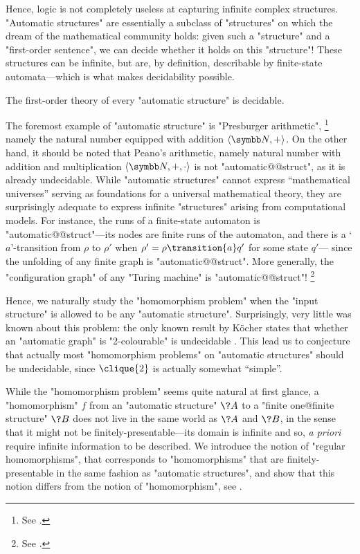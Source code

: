 Hence, logic is not completely useless at capturing infinite complex structures.
"Automatic structures" are essentially a subclass of "structures" on which the dream of
the mathematical community holds: given such a "structure" and a "first-order sentence",
we can decide whether it holds on this "structure"! These structures can be infinite,
but are, by definition, describable by finite-state automata---which is what
makes decidability possible.

\begin{known}
	The first-order theory of every "automatic structure" is decidable.
\end{known}

The foremost example of "automatic structure" is "Presburger arithmetic",%
\footnote{See .}
namely the natural number equipped with addition $\tup{\N, +}$.
On the other hand, it should be noted that Peano's arithmetic, namely natural number with
addition and multiplication $\tup{\N,+,\cdot}$ is not "automatic@@struct",
as it is already undecidable.
While "automatic structures" cannot express ``mathematical universes'' serving as
foundations for a universal mathematical theory, they are surprisingly adequate to
express infinite "structures" arising from computational models.
For instance, the runs of a finite-state automaton is "automatic@@struct"---its nodes
are finite runs of the automaton, and there is a `$a$'-transition from
$\rho$ to $\rho'$ when $\rho' = \rho \transition{a} q'$ for some state $q'$---
since the unfolding of any finite graph is "automatic@@struct".
More generally, the "configuration graph" of any "Turing machine" is "automatic@@struct"!%
\footnote{See .}

Hence, we naturally study the "homomorphism problem" when the "input structure"
is allowed to be any "automatic structure". Surprisingly, very little was known about this problem:
the only known result by Köcher states that whether an "automatic graph" is "2-colourable" is undecidable \cite{Kocher2014AutomatischenGraphen}.
This lead us to conjecture that actually most "homomorphism problems" on "automatic structures"
should be undecidable, since $\clique{2}$ is actually somewhat ``simple''.

While the "homomorphism problem" seems quite natural at first glance, a "homomorphism" $f$
from an "automatic structure" $\?A$ to a "finite one@finite structure" $\?B$ does not live
in the same world as $\?A$ and $\?B$, in the sense that it might not be finitely-presentable---its domain is infinite and so, \emph{a priori} require infinite information to be described.
We introduce the notion of "regular homomorphisms", that corresponds to "homomorphisms" that
are finitely-presentable in the same fashion as "automatic structures", and show that
this notion differs from the notion of "homomorphism",
see .


